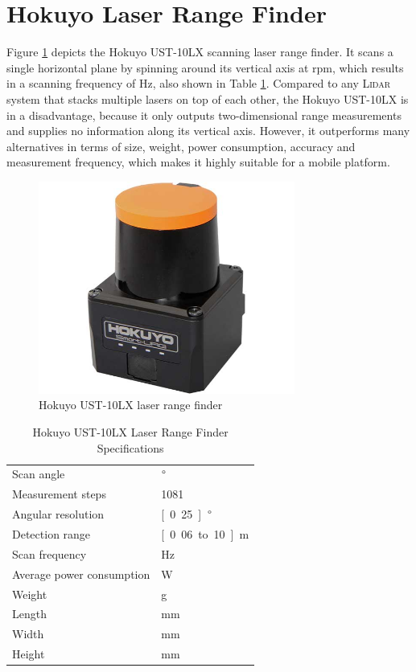 \section{Hokuyo Laser Range Finder}
Figure \ref{pics:hokuyo} depicts the Hokuyo UST-10LX scanning laser range finder. It scans a single horizontal plane by spinning around its vertical axis at \unit[2400]{rpm}, which results in a scanning frequency of \unit[40]{Hz}, also shown in Table \ref{tab:hokuyo}. Compared to any \textsc{Lidar} system that stacks multiple lasers on top of each other, the Hokuyo UST-10LX is in a disadvantage, because it only outputs two-dimensional range measurements and supplies no information along its vertical axis. However, it outperforms many alternatives in terms of size, weight, power consumption, accuracy and measurement frequency, which makes it highly suitable for a mobile platform.


\begin{figure}[h]
   \centering
   \includegraphics[width=0.75\textwidth]{images/hokuyo.jpg}
   \caption{Hokuyo UST-10LX laser range finder}
   \label{pics:hokuyo}
\end{figure}

\begin{table}[h]
\begin{center}
 \caption{Hokuyo UST-10LX Laser Range Finder Specifications}\vspace{1ex}
 \label{tab:hokuyo}
 \begin{tabular}{ll}
 \hline
 Scan angle & \unit[250]{$\degree$} \\
 Measurement steps & 1081 \\
 Angular resolution & \unit[0.25]{$\degree$} \\
 Detection range & \unit[0.06 to 10]{m} \\
 Scan frequency & \unit[40]{Hz} \\
 Average power consumption & \unit[3]{W} \\
 Weight & \unit[130]{g} \\
 Length & \unit[50]{mm} \\
 Width & \unit[50]{mm} \\
 Height &  \unit[70]{mm} \\
 \hline
 \end{tabular}
\end{center}
\end{table}

